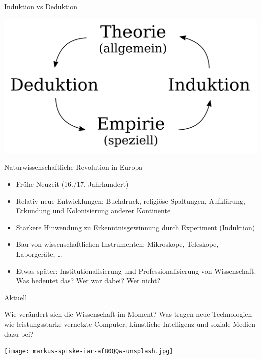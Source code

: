 \documentclass{beamer}
\begin{document}
\begin{frame}{Induktion vs Deduktion}

\centering

\includegraphics[width=\textwidth]{Induktion-Deduktion.svg.png}



\end{frame}

\begin{frame}{Naturwissenschaftliche Revolution in Europa}

\begin{itemize}
    \item 
    Frühe Neuzeit (16./17. Jahrhundert)
    \item 
    Relativ neue Entwicklungen: Buchdruck, religiöse Spaltungen, Aufklärung, Erkundung und Kolonisierung anderer Kontinente
    \item 
    Stärkere Hinwendung zu Erkenntnisgewinnung durch Experiment (Induktion)
    \item 
    Bau von wissenschaftlichen Instrumenten: Mikroskope, Teleskope, Laborgeräte, \dots
    \item 
    Etwas später: Institutionalisierung und Professionalisierung von Wissenschaft. \textcolor{theme}{Was bedeutet das? Wer war dabei? Wer nicht?}
    \end{itemize}
    
\end{frame}






\begin{frame}{Aktuell}

Wie verändert sich die Wissenschaft im Moment? Was tragen neue Technologien wie leistungsstarke vernetzte Computer, künstliche Intelligenz und soziale Medien dazu bei?

\centering

\texttt{[image: markus-spiske-iar-afB0QQw-unsplash.jpg]}
    
\end{frame}
\end{document}
